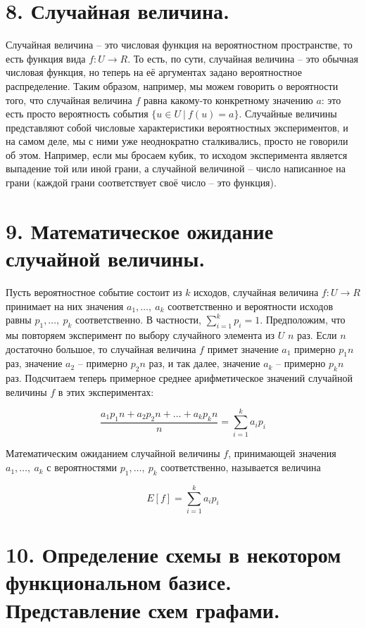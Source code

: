 \documentclass[a4paper, 12pt]{article}
\begin{document}
\section*{8. Случайная величина.}

Случайная величина -- это числовая функция на вероятностном пространстве, то есть функция вида $f : U \to R$. То есть, по сути, случайная величина -- это обычная числовая функция, но теперь на её аргументах задано вероятностное распределение. Таким образом, например, мы можем говорить о вероятности того, что случайная
величина $f$ равна какому-то конкретному значению $a$: это есть просто вероятность события $\{u \in U\ |\ f(u) = a \}$. Случайные величины представляют собой числовые характеристики вероятностных экспериментов, и на самом деле, мы с ними уже неоднократно сталкивались, просто не говорили об этом. Например, если мы бросаем кубик, то исходом эксперимента является выпадение той или иной грани, а случайной величиной -- число написанное на грани (каждой грани соответствует своё число -- это функция).

\section*{9. Математическое ожидание случайной величины.}

Пусть вероятностное событие состоит из $k$ исходов, случайная величина $f : U \to R$ принимает на них значения $a_1, \ldots ,\ a_k$ соответственно и вероятности исходов равны $p_1, \ldots ,\ p_k$ соответственно. В частности, $\sum\limits_{i = 1}^k p_i = 1$. Предположим, что мы повторяем эксперимент по выбору случайного элемента из $U$ $n$ раз. Если $n$ достаточно большое, то случайная величина $f$ примет значение $a_1$ примерно $p_1n$ раз, значение $a_2$ -- примерно $p_2n$ раз, и так далее, значение $a_k$ -- примерно $p_kn$ раз. Подсчитаем теперь примерное среднее арифметическое значений случайной величины $f$ в этих экспериментах:

\[
    \frac{a_1p_1n + a_2p_2n + \ldots + a_kp_kn}{n} = \sum\limits_{i = 1}^k a_ip_i
\]

Математическим ожиданием случайной величины $f$, принимающей значения $a_1, \ldots ,\ a_k$ с вероятностями $p_1, \ldots ,\ p_k$ соответственно, называется величина 

\[
    E[f] = \sum\limits_{i = 1}^k a_ip_i
\]

\section*{10. Определение схемы в некотором функциональном базисе. Представление схем графами.}
\end{document}
